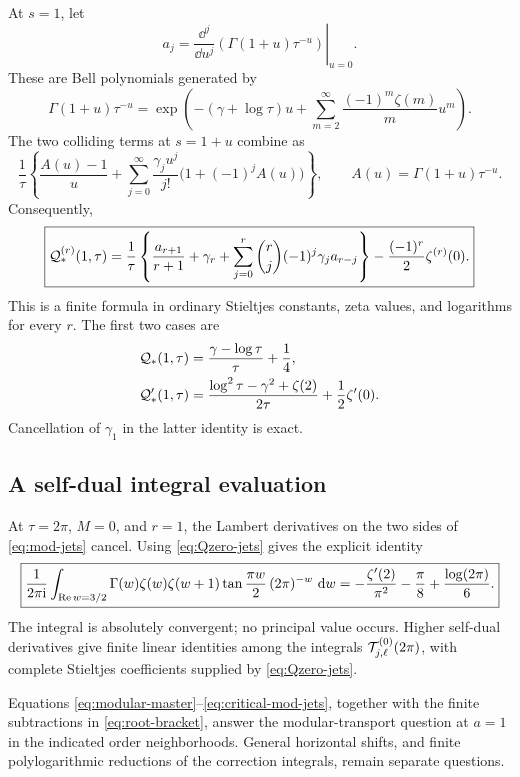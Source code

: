 At \(s=1\), let
\begin{equation}\label{eq:mod-A}
 a_j=\left.\frac{\dd^j}{\dd u^j}
            \left(\Gamma(1+u)\tau^{-u}\right)\right|_{u=0}.
\end{equation}
These are Bell polynomials generated by
\[
 \Gamma(1+u)\tau^{-u}
 =\exp\left(-(\gamma+\log\tau)u+
          \sum_{m=2}^{\infty}\frac{(-1)^m\zeta(m)}m u^m\right).
\]
The two colliding terms at \(s=1+u\) combine as
\[
 \frac1{\tau}
 \left\{\frac{A(u)-1}{u}
       +\sum_{j=0}^{\infty}\frac{\gamma_j u^j}{j!}
                              \bigl(1+(-1)^j A(u)\bigr)\right\},
 \qquad A(u)=\Gamma(1+u)\tau^{-u}.
\]
Consequently,
\begin{equation}\label{eq:Qone-jets}
 \boxed{\displaystyle
 {\cal Q}_*^{(r)}(1,\tau)=
 \frac1{\tau}\left\{\frac{a_{r+1}}{r+1}+\gamma_r+
     \sum_{j=0}^{r}\binom rj(-1)^j\gamma_j a_{r-j}\right\}
       -\frac{(-1)^r}{2}\zeta^{(r)}(0).}
\end{equation}
This is a finite formula in ordinary Stieltjes constants,
zeta values, and logarithms for every \(r\).
The first two cases are
\begin{align}
 {\cal Q}_*(1,\tau)&=\frac{\gamma-\log\tau}{\tau}+\frac14,
 \label{eq:Qone-first}\\
 {\cal Q}_*'(1,\tau)&=
       \frac{\log^2\tau-\gamma^2+\zeta(2)}{2\tau}
                    +\frac12\zeta'(0).
 \label{eq:Qone-second}
\end{align}
Cancellation of \(\gamma_1\) in the latter identity is exact.

\subsection{A self-dual integral evaluation}

At \(\tau=2\pi\), \(M=0\), and \(r=1\), the Lambert
derivatives on the two sides of \eqref{eq:mod-jets} cancel.
Using \eqref{eq:Qzero-jets} gives the explicit identity
\begin{equation}\label{eq:self-dual-integral}
 \boxed{\displaystyle
 \frac1{2\pi\mathrm i}\int_{\operatorname{Re} w=3/2}
   \Gamma(w)\zeta(w)\zeta(w+1)
      \tan\frac{\pi w}{2}\,(2\pi)^{-w}\,\,\mathrm d w
 =-\frac{\zeta'(2)}{\pi^2}-\frac{\pi}{8}
                              +\frac{\log(2\pi)}6.}
\end{equation}
The integral is absolutely convergent; no principal value occurs.
Higher self-dual derivatives give finite linear identities among
the integrals \({\cal T}_{j,\ell}^{(0)}(2\pi)\), with complete
Stieltjes coefficients supplied by \eqref{eq:Qzero-jets}.

Equations \eqref{eq:modular-master}--\eqref{eq:critical-mod-jets},
together with the finite subtractions in \eqref{eq:root-bracket},
answer the modular-transport question at \(a=1\) in the indicated
order neighborhoods. General horizontal shifts, and finite
polylogarithmic reductions of the correction integrals, remain
separate questions.

